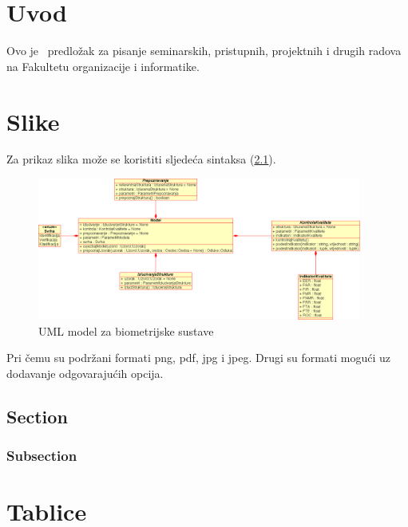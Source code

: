 \documentclass[a4paper,12pt]{foi}
\begin{document}
	
\maketitle
\tableofcontents
\thispagestyle{empty}
\setcounter{page}{0}
\onehalfspacing

\chapter{Uvod}

Ovo je \LaTeXe\ predlo\v{z}ak za pisanje seminarskih, pristupnih, projektnih i drugih radova na Fakultetu organizacije i informatike.


\chapter{Slike}

Za prikaz slika mo\v{z}e se koristiti sljede\'{c}a sintaksa (\ref{slika-1}).

\begin{figure}[h]
\centering 
\includegraphics[width=0.95\textwidth]{model.png}
\caption{UML model za biometrijske sustave \citep{Schatten2008}}
\label{slika-1}
\end{figure}

Pri \v{c}emu su podr\v{z}ani formati png, pdf, jpg i jpeg. Drugi su formati mogu\'{c}i uz dodavanje odgovaraju\'{c}ih opcija.

\section{Section}
\subsection{Subsection}

\chapter{Tablice}
\end{document}
